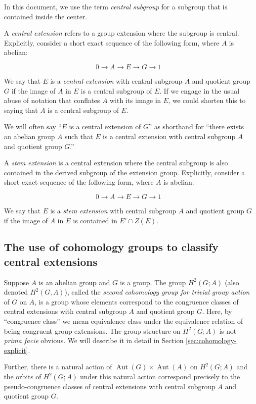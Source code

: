 \documentclass{ucetd}
\begin{document}
In this document, we use the term {\em central subgroup} for a
subgroup that is contained inside the center.

A {\em central extension} refers to a group extension where the
subgroup is central. Explicitly, consider a short exact sequence of
the following form, where $A$ is abelian:

$$0 \to A \to E \to G \to 1$$

We say that $E$ is a {\em central extension} with central subgroup $A$
and quotient group $G$ if the image of $A$ in $E$ is a central
subgroup of $E$. If we engage in the usual abuse of notation that
conflates $A$ with its image in $E$, we could shorten this to saying
that $A$ is a central subgroup of $E$.

We will often say ``$E$ is a central extension of $G$'' as shorthand
for ``there exists an abelian group $A$ such that $E$ is a central
extension with central subgroup $A$ and quotient group $G$.''

A {\em stem extension} is a central extension where the central
subgroup is also contained in the derived subgroup of the extension
group. Explicitly, consider a short exact sequence of the following
form, where $A$ is abelian:

$$0 \to A \to E \to G \to 1$$

We say that $E$ is a {\em stem extension} with central subgroup $A$
and quotient group $G$ if the image of $A$ in $E$ is contained in $E'
\cap Z(E)$.

\subsection{The use of cohomology groups to classify central extensions}\label{sec:second-cohomology-group-classify-extensions}

Suppose $A$ is an abelian group and $G$ is a group. The group
$H^2(G;A)$ (also denoted $H^2(G,A)$), called the {\em second
  cohomology group for trivial group action} of $G$ on $A$, is a group
whose elements correspond to the congruence classes of central
extensions with central subgroup $A$ and quotient group $G$. Here, by
``congruence class'' we mean equivalence class under the equivalence
relation of being congruent group extensions. The group structure on
$H^2(G;A)$ is not {\em prima facie} obvious. We will describe it in
detail in Section \ref{sec:cohomology-explicit}.

Further, there is a natural action of $\operatorname{Aut}(G) \times
\operatorname{Aut}(A)$ on $H^2(G;A)$ and the orbits of $H^2(G;A)$
under this natural action correspond precisely to the
pseudo-congruence classes of central extensions with central subgroup
$A$ and quotient group $G$.
\end{document}
